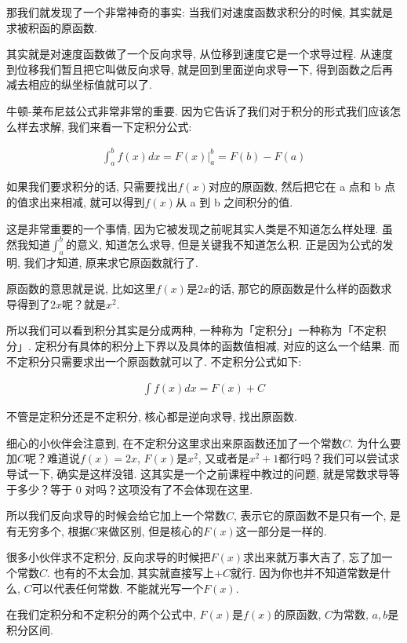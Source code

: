 那我们就发现了一个非常神奇的事实: 当我们对速度函数求积分的时候, 其实就是求被积函的原函数. 

其实就是对速度函数做了一个反向求导, 从位移到速度它是一个求导过程. 从速度到位移我们暂且把它叫做反向求导, 就是回到里面逆向求导一下, 得到函数之后再减去相应的纵坐标值就可以了. 

牛顿-莱布尼兹公式非常非常的重要. 因为它告诉了我们对于积分的形式我们应该怎么样去求解, 我们来看一下定积分公式: 

\begin{align*}
  \int_a^b f(x)dx = F(x) \vert_a^b = F(b) - F(a)
\end{align*}

如果我们要求积分的话, 只需要找出$f(x)$对应的原函数, 然后把它在 a 点和 b 点的值求出来相减, 就可以得到$f(x)$从 a 到 b 之间积分的值. 

这是非常重要的一个事情, 因为它被发现之前呢其实人类是不知道怎么样处理. 虽然我知道$\int_a^b$的意义, 知道怎么求导, 但是关键我不知道怎么积. 正是因为公式的发明, 我们才知道, 原来求它原函数就行了. 

原函数的意思就是说, 比如这里$f(x)$是$2x$的话, 那它的原函数是什么样的函数求导得到了$2x$呢？就是$x^2$. 

所以我们可以看到积分其实是分成两种, 一种称为「定积分」一种称为「不定积分」. 定积分有具体的积分上下界以及具体的函数值相减, 对应的这么一个结果. 而不定积分只需要求出一个原函数就可以了. 不定积分公式如下: 

\begin{align*}
  \int f(x)dx = F(x) + C
\end{align*}

不管是定积分还是不定积分, 核心都是逆向求导, 找出原函数. 

细心的小伙伴会注意到, 在不定积分这里求出来原函数还加了一个常数$C$. 为什么要加$C$呢？难道说$f(x) = 2x$, $F(x)$是$x^2$, 又或者是$x^2 + 1$都行吗？我们可以尝试求导试一下, 确实是这样没错. 这其实是一个之前课程中教过的问题, 就是常数求导等于多少？等于 0 对吗？这项没有了不会体现在这里. 

所以我们反向求导的时候会给它加上一个常数$C$, 表示它的原函数不是只有一个, 是有无穷多个, 根据$C$来做区别, 但是核心的$F(x)$这一部分是一样的.

很多小伙伴求不定积分, 反向求导的时候把$F(x)$求出来就万事大吉了, 忘了加一个常数$C$. 也有的不太会加, 其实就直接写上$+C$就行. 因为你也并不知道常数是什么, $C$可以代表任何常数. 不能就光写一个$F(x)$. 

在我们定积分和不定积分的两个公式中,  $F(x)$是$f(x)$的原函数,  $C$为常数,  $a, b$是积分区间. 

